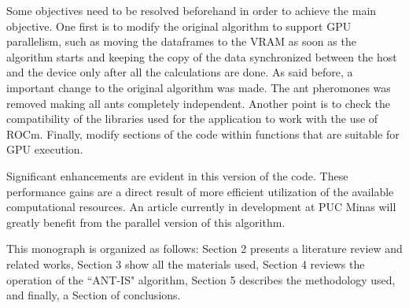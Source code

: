 Some objectives need to be resolved beforehand in order to achieve the main objective. One first is to modify the original algorithm to support GPU parallelism, such as moving the dataframes to the VRAM as soon as the algorithm starts and keeping the copy of the data synchronized between the host and the device only after all the calculations are done.
As said before, a important change to the original algorithm was made. The ant pheromones was removed making all ants completely independent.
Another point is to check the compatibility of the libraries used for the application to work with the use of ROCm. Finally, modify sections of the code within functions that are suitable for GPU execution.

Significant enhancements are evident in this version of the code. These performance gains are a direct result of more efficient utilization of the available computational resources. An article currently in development at PUC Minas will greatly benefit from the parallel version of this algorithm.

This monograph is organized as follows: Section 2 presents a literature review and related works, Section 3 show all the materials used, Section 4 reviews the operation of the ``ANT-IS" algorithm, Section 5 describes the methodology used, and finally, a Section of conclusions.
